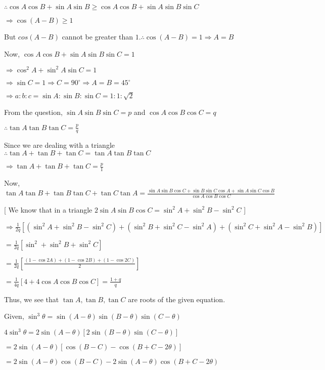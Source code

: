   $\therefore \cos A\cos B + \sin A\sin B\geq \cos A\cos B + \sin A\sin B\sin C$

  $\Rightarrow \cos(A - B)\geq 1$

  But $cos(A - B)$ cannot be greater than $1. \therefore \cos(A - B) = 1\Rightarrow A = B$

  Now, $\cos A\cos B + \sin A\sin B\sin C = 1$

  $\Rightarrow \cos^2A + \sin^2A\sin C = 1$

  $\Rightarrow \sin C= 1 \Rightarrow C=90^\circ\Rightarrow A = B = 45^\circ$

  $\Rightarrow a:b:c = \sin A:\sin B: \sin C = 1:1:\sqrt{2}$

\item From the question, $\sin A\sin B\sin C = p$ and $\cos A\cos B\cos C = q$

  $\therefore \tan A\tan B\tan C = \frac{p}{q}$

  Since we are dealing with a triangle $\therefore \tan A + \tan B + \tan C = \tan A\tan B\tan C$

  $\Rightarrow \tan A + \tan B + \tan C = \frac{p}{1}$

  Now, $\tan A\tan B + \tan B\tan C + \tan C\tan A = \frac{\sin A\sin B\cos C + \sin B\sin C\cos A + \sin A\sin C\cos
    B}{\cos A\cos B\cos C}$

  [ We know that in a triangle $2\sin A\sin B\cos C = \sin^2A + \sin^2B - \sin^2C$ ]

  $\Rightarrow  \frac{1}{2q}[(\sin^2A + \sin^2B - \sin^2C) + (\sin^2B + \sin^2C - \sin^2A) + (\sin^2C + \sin^2A -
    \sin^2B)]$

  $= \frac{1}{2q}[\sin^2 + \sin^2B + \sin^2C]$

  $= \frac{1}{2q}\left[\frac{(1 - \cos2A) + (1 - \cos2B) + (1 - \cos2C)}{2}\right]$

  $= \frac{1}{4q}[4 + 4\cos A\cos B\cos C] = \frac{1 + q}{q}$

  Thus, we see that $\tan A, \tan B, \tan C$ are roots of the given equation.

\item Given, $\sin^3\theta = \sin(A - \theta)\sin(B - \theta)\sin(C - \theta)$

  $4\sin^3\theta = 2\sin(A - \theta)[2\sin(B - \theta)\sin(C - \theta)]$

  $= 2\sin(A - \theta)[\cos(B - C) - \cos(B + C - 2\theta)]$

  $= 2\sin(A - \theta)\cos(B - C) -2\sin(A - \theta)\cos(B + C - 2\theta)$

